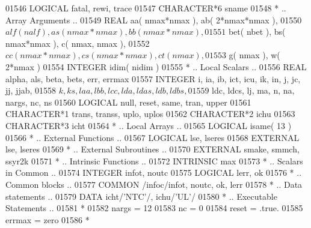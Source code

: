 \begin{DoxyCode}
01546       \textcolor{keywordtype}{LOGICAL}            fatal, rewi, trace
01547       \textcolor{keywordtype}{CHARACTER*6}        sname
01548 \textcolor{comment}{*     .. Array Arguments ..}
01549       \textcolor{keywordtype}{REAL}               aa( nmax*nmax ), ab( 2*nmax*nmax ),
01550      $                   alf( nalf ), as( nmax*nmax ), bb( nmax*nmax ),
01551      $                   bet( nbet ), bs( nmax*nmax ), c( nmax, nmax ),
01552      $                   cc( nmax*nmax ), cs( nmax*nmax ), ct( nmax ),
01553      $                   g( nmax ), w( 2*nmax )
01554       \textcolor{keywordtype}{INTEGER}            idim( nidim )
01555 \textcolor{comment}{*     .. Local Scalars ..}
01556       \textcolor{keywordtype}{REAL}               alpha, als, beta, bets, err, errmax
01557       \textcolor{keywordtype}{INTEGER}            i, ia, ib, ict, icu, ik, in, j, jc, jj, jjab,
01558      $                   k, ks, laa, lbb, lcc, lda, ldas, ldb, ldbs,
01559      $                   ldc, ldcs, lj, ma, n, na, nargs, nc, ns
01560       \textcolor{keywordtype}{LOGICAL}            null, reset, same, tran, upper
01561       \textcolor{keywordtype}{CHARACTER*1}        trans, transs, uplo, uplos
01562       \textcolor{keywordtype}{CHARACTER*2}        ichu
01563       \textcolor{keywordtype}{CHARACTER*3}        icht
01564 \textcolor{comment}{*     .. Local Arrays ..}
01565       \textcolor{keywordtype}{LOGICAL}            isame( 13 )
01566 \textcolor{comment}{*     .. External Functions ..}
01567       \textcolor{keywordtype}{LOGICAL}            lse, lseres
01568       \textcolor{keywordtype}{EXTERNAL}           lse, lseres
01569 \textcolor{comment}{*     .. External Subroutines ..}
01570       \textcolor{keywordtype}{EXTERNAL}           smake, smmch, ssyr2k
01571 \textcolor{comment}{*     .. Intrinsic Functions ..}
01572       \textcolor{keywordtype}{INTRINSIC}          max
01573 \textcolor{comment}{*     .. Scalars in Common ..}
01574       \textcolor{keywordtype}{INTEGER}            infot, noutc
01575       \textcolor{keywordtype}{LOGICAL}            lerr, ok
01576 \textcolor{comment}{*     .. Common blocks ..}
01577       \textcolor{keyword}{COMMON}             /infoc/infot, noutc, ok, lerr
01578 \textcolor{comment}{*     .. Data statements ..}
01579       \textcolor{keyword}{DATA}               icht/\textcolor{stringliteral}{'NTC'}/, ichu/\textcolor{stringliteral}{'UL'}/
01580 \textcolor{comment}{*     .. Executable Statements ..}
01581 \textcolor{comment}{*}
01582       nargs = 12
01583       nc = 0
01584       reset = .true.
01585       errmax = zero
01586 \textcolor{comment}{*}

\end{DoxyCode}
